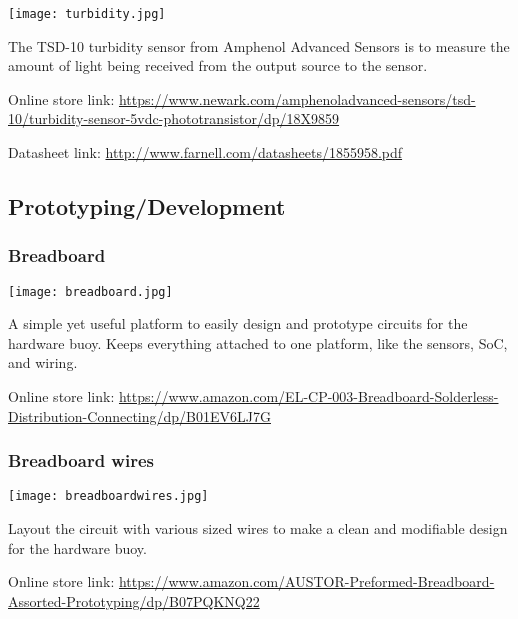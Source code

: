 \hspace{2em}
\texttt{[image: turbidity.jpg]}

\begin{flushleft}
    The TSD-10 turbidity sensor from Amphenol Advanced Sensors is to measure 
    the amount of light being received from the output source to the sensor.
    \newline

    Online store link: \newline
    \footnotesize\url{https://www.newark.com/amphenoladvanced-sensors/tsd-10/turbidity-sensor-5vdc-phototransistor/dp/18X9859}

    \normalsize Datasheet link: \newline
    \footnotesize\url{http://www.farnell.com/datasheets/1855958.pdf}
\end{flushleft}

\subsection{Prototyping/Development}

\subsubsection{Breadboard}

\hspace{2em}
\texttt{[image: breadboard.jpg]}

\begin{flushleft}
    A simple yet useful platform to easily design and prototype circuits for 
    the hardware buoy. Keeps everything attached to one platform, like the 
    sensors, SoC, and wiring.
    \newline

    Online store link: \newline
    \footnotesize\url{https://www.amazon.com/EL-CP-003-Breadboard-Solderless-Distribution-Connecting/dp/B01EV6LJ7G}

\end{flushleft}

\subsubsection{Breadboard wires}

\hspace{2em}
\texttt{[image: breadboardwires.jpg]}

\begin{flushleft}
    Layout the circuit with various sized wires to make a clean and modifiable 
    design for the hardware buoy.
    \newline

    Online store link: \newline
    \footnotesize\url{https://www.amazon.com/AUSTOR-Preformed-Breadboard-Assorted-Prototyping/dp/B07PQKNQ22}

\end{flushleft}

